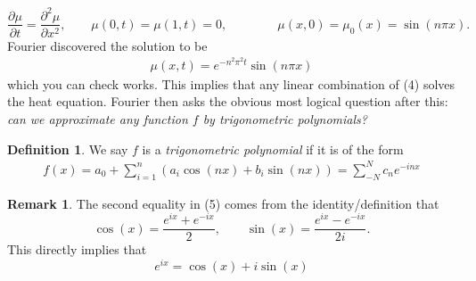\documentclass[10pt, oneside]{article}
\theoremstyle{definition}
\newtheorem{defn}{Definition}
\newtheorem{rem}{Remark}
\begin{document}
\[\frac{\partial \mu}{\partial t} = \frac{\partial^2 \mu}{\partial x^2}, \qquad \mu(0,t) = \mu(1,t) = 0, \qquad \qquad \mu(x,0) = \mu_0(x) = \sin(n\pi x).\] Fourier discovered the solution to be 
\begin{align}
 \mu(x,t) = e^{-n^2\pi^2t}\sin(n\pi x)   
\end{align}
 which you can check works. This implies that any linear combination of (4) solves the heat equation. Fourier then asks the obvious most logical question after this: \textit{can we approximate any function $f$ by trigonometric polynomials?}
 \begin{defn}
     We say $f$ is a  \textit{trigonometric polynomial} if it is of the form
     \begin{align}
     f(x) = a_0 + \sum_{i=1}^n \left(a_i \cos(nx) + b_i \sin(nx)\right) = \sum_{-N}^N c_n e^{-inx}    
     \end{align}
     
 \end{defn}
 \begin{rem}
     The second equality in (5) comes from the identity/definition that
     \[\cos(x) = \frac{e^{ix} + e^{-ix}}{2}, \qquad \sin(x) = \frac{e^{ix} - e^{-ix}}{2i}.\] This directly implies that 
     \[e^{ix} = \cos(x) + i\sin(x)\]
 \end{rem}
\end{document}
